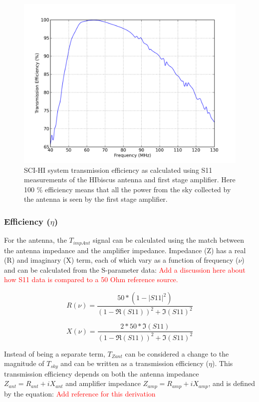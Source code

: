 \begin{figure}[htb]
\begin{center}
\includegraphics[width=0.9\linewidth]{Data_analysis/figures/old_ant_efficiency.png}
\caption{SCI-HI system transmission efficiency as calculated using S11 measurements of the HIbiscus antenna and first stage amplifier. Here 100 \% efficiency means that all the power from the sky collected by the antenna is seen by the first stage amplifier. }
\label{Fig:eff}
\end{center}
\end{figure}

\subsubsection{Efficiency ($\eta$)}
For the antenna, the $T_{impAnt}$ signal can be calculated using the match between the antenna impedance and the amplifier impedance. Impedance (Z) has a real (R) and imaginary (X) term, each of which vary as a function of frequency ($\nu$) and can be calculated from the S-parameter data: \textcolor{red}{Add a discussion here about how S11 data is compared to a 50 Ohm reference source.}

\begin{equation}
R(\nu) = \frac{50*(1- |S11|^2)}{(1-\Re(S11))^2+\Im(S11)^2}
\end{equation}

\begin{equation}
X(\nu) = \frac{2*50*\Im(S11)}{(1-\Re(S11))^2+\Im(S11)^2}
\end{equation} 

Instead of being a separate term, $T_{Zant}$ can be considered a change to the magnitude of $T_{sky}$ and can be written as a transmission efficiency ($\eta$). This transmission efficiency depends on both the antenna impedance $Z_{ant} = R_{ant}+i X_{ant}$ and amplifier impedance $Z_{amp} = R_{amp} + i X_{amp}$, and is defined by the equation: \textcolor{red}{Add reference for this derivation}

